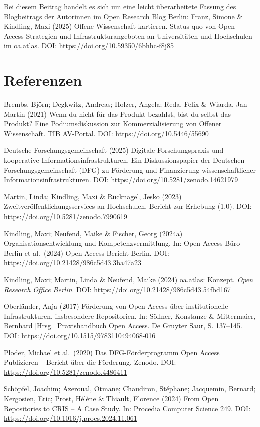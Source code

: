 \documentclass[a4paper,
fontsize=11pt,
oneside,
numbers=noperiodatend,
parskip=half-,
bibliography=totoc,
final
]{scrartcl}
\begin{document}
Bei diesem Beitrag handelt es sich um eine leicht überarbeitete Fassung
des Blogbeitrags der Autorinnen im Open Research Blog Berlin: Franz,
Simone \& Kindling, Maxi (2025) Offene Wissenschaft kartieren. Status
quo von Open-Access-Strategien und Infrastrukturangeboten an
Universitäten und Hochschulen im oa.atlas. DOI:
\url{https://doi.org/10.59350/6bhhc-f8j85}

\section{Referenzen}\label{referenzen}

Brembs, Björn; Degkwitz, Andreas; Holzer, Angela; Reda, Felix \& Wiarda,
Jan-Martin (2021) Wenn du nicht für das Produkt bezahlst, bist du
selbst das Produkt? Eine Podiumsdiskussion zur Kommerzialisierung von
Offener Wissenschaft. TIB AV-Portal. DOI:
\url{https://doi.org/10.5446/55690}

Deutsche Forschungsgemeinschaft (2025) Digitale Forschungspraxis und
kooperative Informationsinfrastrukturen. Ein Diskussionspapier der
Deutschen Forschungsgemeinschaft (DFG) zu Förderung und Finanzierung
wissenschaftlicher Informationsinfrastrukturen. DOI:
\url{https://doi.org/10.5281/zenodo.14621979}

Martin, Linda; Kindling, Maxi \& Rücknagel, Jesko (2023)
Zweitveröffentlichungsservices an Hochschulen. Bericht zur Erhebung
(1.0). DOI: \url{https://doi.org/10.5281/zenodo.7990619}

Kindling, Maxi; Neufend, Maike \& Fischer, Georg (2024a)
Organisationsentwicklung und Kompetenzvermittlung. In: Open-Access-Büro
Berlin et al.~(2024) Open-Access-Bericht Berlin. DOI:
\url{https://doi.org/10.21428/986c5d43.3ba47a23}

Kindling, Maxi; Martin, Linda \& Neufend, Maike (2024) oa.atlas:
Konzept. \emph{Open Research Office Berlin}. DOI:
\url{https://doi.org/10.21428/986c5d43.54fbd167}

Oberländer, Anja (2017) Förderung von Open Access über institutionelle
Infrastrukturen, insbesondere Repositorien. In: Söllner, Konstanze \&
Mittermaier, Bernhard {[}Hrsg.{]} Praxishandbuch Open Access. De
Gruyter Saur, S. 137--145. DOI:
\url{https://doi.org/10.1515/9783110494068-016}

Ploder, Michael et al.~(2020) Das DFG-Förderprogramm Open Access
Publizieren -- Bericht über die Förderung. Zenodo. DOI:
\url{https://doi.org/10.5281/zenodo.4486411}

Schöpfel, Joachim; Azeroual, Otmane; Chaudiron, Stéphane; Jacquemin,
Bernard; Kergosien, Eric; Prost, Hélène \& Thiault, Florence (2024) From
Open Repositories to CRIS -- A Case Study. In: Procedia Computer Science
249. DOI: \url{https://doi.org/10.1016/j.procs.2024.11.061}
\end{document}
